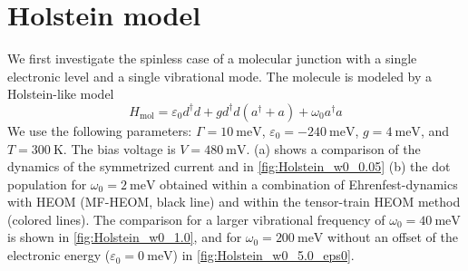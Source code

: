\documentclass{article}
\begin{document}
%
\section{Holstein model}
We first investigate the spinless case of a molecular junction with a single electronic level and a single vibrational mode. The molecule is modeled by a Holstein-like model
\begin{equation}
	H_\mathrm{mol} = \varepsilon_0 d^\dagger d + g d^\dagger d (a^\dagger + a) + \omega_0 a^\dagger a
\end{equation}
We use the following parameters: $\Gamma = \SI{10}{\milli\electronvolt}$, $\varepsilon_0 = -\SI{240}{\milli\electronvolt}$, $g=\SI{4}{\milli\electronvolt}$, and $T=\SI{300}{\kelvin}$. The bias voltage is $V=\SI{480}{\milli\volt}$.  (a) shows a comparison of the dynamics of the symmetrized current and in \cref{fig:Holstein_w0_0.05} (b) the dot population for $\omega_0=\SI{2}{\milli\electronvolt}$ obtained within a combination of Ehrenfest-dynamics with HEOM (MF-HEOM, black line) and within the tensor-train HEOM method (colored lines). 
The comparison for a larger vibrational frequency of $\omega_0=\SI{40}{\milli\electronvolt}$ is shown in \cref{fig:Holstein_w0_1.0}, and for $\omega_0=\SI{200}{\milli\electronvolt}$ without an offset of the electronic energy ($\varepsilon_0 = \SI{0}{\milli\electronvolt}$) in \cref{fig:Holstein_w0_5.0_eps0}. 
\end{document}
